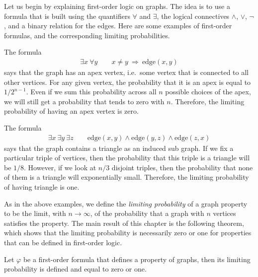 Let us begin by explaining first-order logic on graphs. The idea is to use a formula that is built using the quantifiers $\forall$ and $\exists$,  the logical connectives $\land$, $\lor$, $\neg$, and a binary relation for the edges. Here are some examples of first-order formulas, and the corresponding limiting probabilities.

\begin{example}[Apex]
	The formula 
	\begin{align*}
	\exists x \ \forall y \qquad x \neq y \ \Rightarrow \ \text{edge}(x,y)
	\end{align*}
	says that the graph has an apex vertex, i.e.~some vertex that is connected to all other vertices. For any given vertex, the probability that it is an apex is equal to $1/2^{n-1}$. Even if we sum this probability across all $n$ possible choices of the apex, we will still get a probability that tends to zero with $n$. Therefore, the limiting probability of having an apex vertex is zero. 
\end{example}

\begin{example}[Triangle]
	The formula 
	\begin{align*}
	\exists x \ \exists y \ \exists z \qquad 
	\text{edge}(x,y) \land \text{edge}(y,z) \land \text{edge}(z,x)
	\end{align*}
	says that the graph contains a triangle as an induced sub graph. If we fix a particular triple of vertices, then the probability that this triple is a triangle will be $1/8$. However, if we look at $n/3$ disjoint triples, then the probability that none of them is a triangle will exponentially small. Therefore, the limiting probability of having triangle is one. 
\end{example}

As in the above examples, we define the \emph{limiting probability} of a graph property to be  the limit, with $n \to \infty$, of the probability that a graph with $n$ vertices satisfies the property. The main result of this chapter is the following theorem, which shows that the limiting probability is necessarily zero or one for properties that can be defined in first-order logic.

\begin{theorem}\label{thm:zero-one-law}
	Let $\varphi$ be a first-order formula that defines a property of graphs, then its limiting probability is defined and equal to zero or one.  
\end{theorem}

